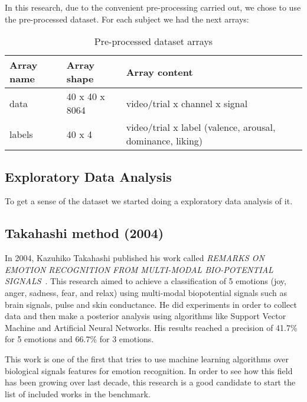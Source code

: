 \documentclass{sig-alternate}
\begin{document}
In this research, due to the convenient pre-processing carried out, we chose to use the pre-processed
 dataset. For each subject we had the next arrays:

\begin{table}[h!]
\footnotesize
\begin{center}
\begin{tabular}{|p{1cm}|p{2cm}|p{4.5cm}|}
      	\hline 
      	Array name & Array shape & Array content \\ 
      	\hline 
      	data & 40 x 40 x 8064 & video/trial x channel x signal \\ 
      	\hline
      	labels & 40 x 4 & video/trial x label (valence, arousal, dominance, liking) \\ 
      	\hline 
\end{tabular} 
\end{center}
\caption{Pre-processed dataset arrays}
\label{tab:dataset}
\end{table}       	
	
\subsection{Exploratory Data Analysis}

To get a sense of the dataset we started doing a exploratory data analysis of it. 	
	
\subsection{Takahashi method (2004)}	

In 2004, Kazuhiko Takahashi published his work called 
\textit{REMARKS ON EMOTION RECOGNITION FROM MULTI-MODAL BIO-POTENTIAL SIGNALS}~\cite{takahashi2004}. This 
research aimed to achieve a classification of 5 emotions (joy, anger, sadness, fear, and relax)
using multi-modal biopotential signals such as brain signals, pulse and skin conductance. He
 did experiments in order to collect data and then make a posterior analysis using algorithms
 like Support Vector Machine and Artificial Neural Networks. His results reached a precision of
 41.7\% for 5 emotions and 66.7\% for 3 emotions. 

This work is one of the first that tries to use machine learning algorithms
 over biological signals features for emotion recognition. In order to see
 how this field has been growing over last decade, this research is a good
 candidate to start the list of included works in the benchmark.  
\end{document}
